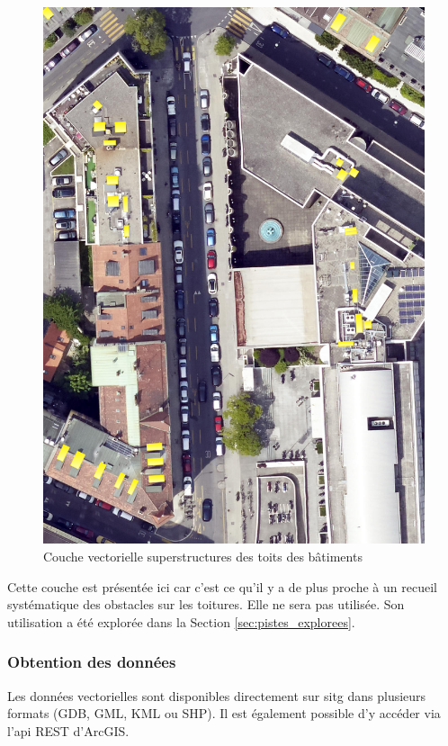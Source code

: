\begin{figure}[H]
    \centering
    \includegraphics[width=1\linewidth]{02-main//figures/ch3/ch3_dataset_methodo_04_batiment_horsol_toiture_sp.png}
    \caption{Couche vectorielle superstructures des toits des bâtiments}
    \label{fig:ch3_dataset_methodo_04_batiment_horsol_toiture_sp}
\end{figure}

Cette couche est présentée ici car c'est ce qu'il y a de plus proche à un recueil systématique des obstacles sur les toitures. Elle ne sera pas utilisée. Son utilisation a été explorée dans la Section \ref{sec:pistes_explorees}.

\subsubsection{Obtention des données}
Les données vectorielles sont disponibles directement sur \acrshort{sitg} dans plusieurs formats (GDB, GML, KML ou SHP). Il est également possible d'y accéder via l'\acrshort{api} REST d'ArcGIS.

